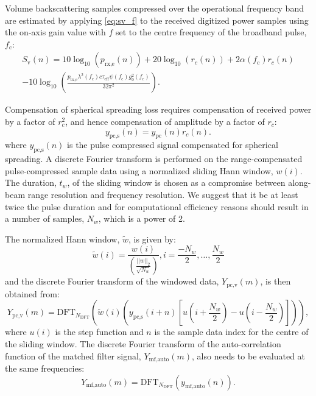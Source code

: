 \documentclass[preprint,12pt,TurnOnLineNumbers]{JASAnew}
\newcommand{\samplesymt}{n}
\newcommand{\samplesymf}{m}
\newcommand{\genidxsym}{i}
\newcommand{\fc}{f_{\textrm{c}}}
\newcommand{\ptxe}{p_{\textrm{tx,e}}}
\newcommand{\prxe}{p_{\textrm{rx,e}}}
\newcommand{\teff}{\tau_{\textrm{eff}}}
\newcommand{\ypc}{y_{\textrm{pc}}}
\newcommand{\ypcspread}{y_{\textrm{pc,s}}}
\newcommand{\ymfauto}{y_{\textrm{mf,auto}}}
\newcommand{\ypcvolumef}{Y_{\textrm{pc,v}}}
\newcommand{\ymfautof}{Y_{\textrm{mf,auto}}}
\newcommand{\hannw}{w}
\newcommand{\hannwnorm}{\tilde{\hannw}}
\newcommand{\nw}{N_{\hannw}}
\newcommand{\tslide}{t_w}
\newcommand{\sv}{S_{\textrm{v}}}
\newcommand{\range}{r}
\newcommand{\gainzero}{g_0}
\newcommand{\eqang}{\psi}
\newcommand{\wlen}{\lambda}
\newcommand{\cw}{c}
\newcommand{\absorp}{\alpha}
\newcommand{\dft}{\textrm{DFT}}
\newcommand{\ndft}{{N_{\textrm{DFT}}}}
\begin{document}
Volume backscattering samples compressed over the operational frequency band are estimated by applying \autoref{eq:sv_f} to the received digitized power samples using the on-axis gain value with $f$ set to the centre frequency of the broadband pulse, $\fc$:
\begin{equation}
\label{eq:Sv}
\begin{split}
\sv(\samplesymt)  =  10\log_{10}(\prxe(\samplesymt)) + 20\log_{10}(\range_c(\samplesymt)) + 2\absorp(\fc)\range_c(\samplesymt) \\
- 10\log_{10}\left( \frac{\ptxe \wlen^2(\fc) \cw \teff \eqang(\fc) \gainzero^2(\fc)}{32\pi^2} \right).
\end{split}
\end{equation}

Compensation of spherical spreading loss requires compensation of received power by a factor of $r_c^2$, and hence compensation of amplitude by a factor of $\range_c$:
%
\begin{equation}
\label{eq:spreadcomp}
\ypcspread(\samplesymt) = \ypc(\samplesymt)\range_c(\samplesymt).
\end{equation}
%
where $\ypcspread(\samplesymt)$ is the pulse compressed signal compensated for spherical spreading. A discrete Fourier transform is performed on the range-compensated pulse-compressed sample data using a normalized sliding Hann window, $\hannw(\genidxsym)$. The duration, $\tslide$, of the sliding window is chosen as a compromise between along-beam range resolution and frequency resolution. We suggest that it be at least twice the pulse duration and for computational efficiency reasons should result in a number of samples, $\nw$, which is a power of 2.

The normalized Hann window, $\hannwnorm$, is given by: 
%
\begin{equation}
\label{eq:hannw}
\hannwnorm(\genidxsym) = \frac{\hannw(\genidxsym)}{\left( \frac{||\hannw||_2}{\sqrt{\nw}} \right)}, i = \frac{-\nw}{2}, \ldots, \frac{\nw}{2}
\end{equation}
%
and the discrete Fourier transform of the windowed data, $\ypcvolumef(\samplesymf)$, is then obtained from:
%
\begin{equation}
\label{eq:FFT_volume}
\ypcvolumef(\samplesymf) = \dft_\ndft 
\left( \hannwnorm(\genidxsym) \left(\ypcspread (\genidxsym+\samplesymt) \left[ u(\genidxsym + \frac{\nw}{2}) - u(\genidxsym - \frac{\nw}{2}) \right] \right) \right),
\end{equation}
%
where $u(\genidxsym)$ is the step function and $\samplesymt$ is the sample data index for the centre of the sliding window. The discrete Fourier transform of the auto-correlation function of the matched filter signal, $\ymfautof(\samplesymf)$, also needs to be evaluated at the same frequencies:
%
\begin{equation}
\label{eq:FFT_TX_Auto}
\ymfautof(\samplesymf)  =  \dft_\ndft (\ymfauto(\samplesymt)).
\end{equation}
\end{document}
